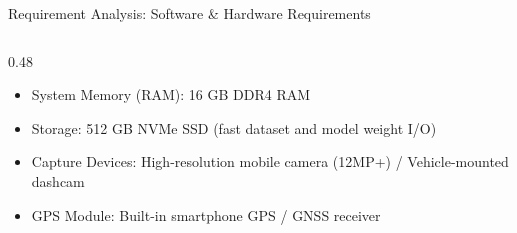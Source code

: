 \documentclass[10pt]{beamer}
\def\\{}%
\def\textbf#1{#1}%
\def\begin#1{}%
\def\end#1{}%
\begin{document}
\begin{frame}{Requirement Analysis: Software \& Hardware Requirements}
\begin{columns}[t]
\begin{column}{0.48\textwidth}
\begin{itemize}
                \item \textbf{System Memory (RAM):} \\ 16 GB DDR4 RAM
                \item \textbf{Storage:} \\ 512 GB NVMe SSD (fast dataset and model weight I/O)
                \item \textbf{Capture Devices:} \\ High-resolution mobile camera (12MP+) / Vehicle-mounted dashcam
                \item \textbf{GPS Module:} \\ Built-in smartphone GPS / GNSS receiver
            \end{itemize}
        \end{column}
    \end{columns}
\end{frame}
\end{document}
